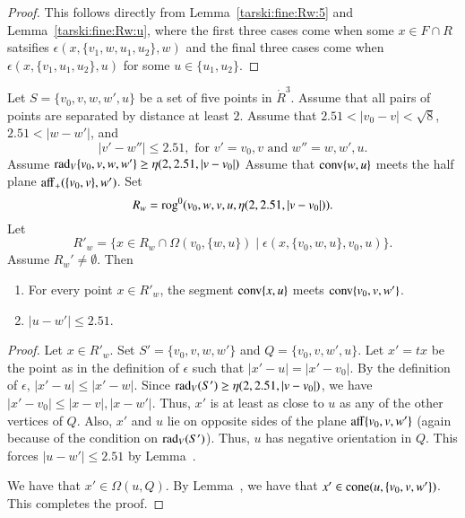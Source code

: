 \begin{proof}  This follows directly from Lemma~\ref{tarski:fine:Rw:5}
and Lemma~\ref{tarski:fine:Rw:u}, where the first three cases
come when some $x\in F\cap R$ satsifies
  $\epsilon(x,\{v_1,w,u_1,u_2\},w)$ and the final three cases
come when $\epsilon(x,\{v_1,u_1,u_2\},u)$ for some $u\in \{u_1,u_2\}$.
\end{proof}



\newpage
\begin{lemma}
Let $S=\{v_0,v,w,w',u\}$ be a set of five points in $\ring{R}^3$.
Assume that all pairs of points are separated by distance at
least $2$. Assume that $2.51<|v_0-v|<\sqrt8$, $2.51<|w-w'|$, and
  $$
  |v'-w''| \le 2.51, \text{ for } v'=v_0,v \text{ and } w''=w,w',u.
  $$
Assume $\operatorname{rad}_V\{v_0,v,w,w'\}\ge\eta(2,2.51,|v-v_0|)$
Assume that ${\operatorname{conv}}\{w,u\}$ meets the
half plane ${\operatorname{aff}}_+(\{v_0,v\},w')$.
Set
  $$R_w={\operatorname{rog}}^0(v_0,w,v,u,\eta(2,2.51,|v-v_0|)).$$
Let 
   $$R'_w = \{x\in R_w \cap\Omega(v_0,\{w,u\}) \mid
     \epsilon(x,\{v_0,w,u\},v_0,u)\}.$$
Assume $R_w'\ne \emptyset$.
Then
\begin{enumerate}
 \item  For every point $x\in R'_w$, the segment ${\operatorname{conv}}\{x,u\}$ meets
  ${\operatorname{conv}}\{v_0,v,w'\}$.
\item $|u-w'|\le 2.51$.
\end{enumerate}
\end{lemma}

\begin{proof} 
Let $x\in R'_w$. Set $S'=\{v_0,v,w,w'\}$ and $Q=\{v_0,v,w',u\}$.
Let $x' = t x$ be the point as in the definition of $\epsilon$ such
that $|x'-u|=|x'-v_0|$.  By the definition of $\epsilon$,
$|x'-u| \le |x'-w|$.  Since $\operatorname{rad}_V(S')\ge\eta(2,2.51,|v-v_0|)$, we have
$|x'-v_0| \le |x-v|,|x-w'|$.  Thus, $x'$ is at least as close to $u$
as any of the other vertices of $Q$.  Also, $x'$
and $u$ lie on opposite sides of the plane ${\operatorname{aff}}\{v_0,v,w'\}$
(again because of the condition on $\operatorname{rad}_V(S')$).  Thus, $u$ has
negative orientation in $Q$.  This forces 
$|u-w'|\le 2.51$ by Lemma~.

We have that $x'\in\Omega(u,Q)$.  By Lemma~,
we have that $x'\in{\operatorname{cone}}(u,\{v_0,v,w'\})$.  This completes
the proof.
\end{proof}

